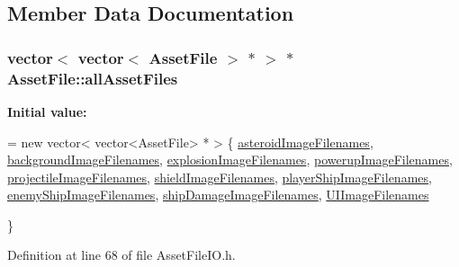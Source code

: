 \subsection{Member Data Documentation}
\hypertarget{struct_asset_file_a9bd02c38dcc2dc973d65b92c80d35570}{
\subsubsection[{all\-Asset\-Files}]{\setlength{\rightskip}{0pt plus 5cm}vector$<$ vector$<$ {\bf Asset\-File} $>$ $\ast$ $>$ $\ast$ Asset\-File\-::all\-Asset\-Files\hspace{0.3cm}{\ttfamily [static]}}}\label{struct_asset_file_a9bd02c38dcc2dc973d65b92c80d35570}
{\bfseries Initial value\-:}
\begin{DoxyCode}
= \textcolor{keyword}{new} vector< vector<AssetFile> * > \{
    \hyperlink{struct_asset_file_a7482e097719d1baa3a15fc3a5a00e15e}{asteroidImageFilenames},
    \hyperlink{struct_asset_file_a54cd19685e8f404021aeef79eb775430}{backgroundImageFilenames},
    \hyperlink{struct_asset_file_a71a63898ce62bf0afc9fc1e8736cfb1d}{explosionImageFilenames},
    \hyperlink{struct_asset_file_afcf268447c77710c71d5503668e0afb7}{powerupImageFilenames},
    \hyperlink{struct_asset_file_aa4c45964db96750b68dc082ccbd6adb3}{projectileImageFilenames},
    \hyperlink{struct_asset_file_a190e00509710ab08fa4effe17ef443f0}{shieldImageFilenames},
    \hyperlink{struct_asset_file_a2e2753d8110ad1c4726f724e15f5b831}{playerShipImageFilenames},
    \hyperlink{struct_asset_file_a792cd746ec7903ca9d34a094627bc947}{enemyShipImageFilenames},
    \hyperlink{struct_asset_file_a372beb61728cbc13001766c79ab1ee70}{shipDamageImageFilenames},
    \hyperlink{struct_asset_file_a453cc790da71efe1ad15a45d1a3cde40}{UIImageFilenames}
    
\}
\end{DoxyCode}


Definition at line 68 of file Asset\-File\-I\-O.\-h.

